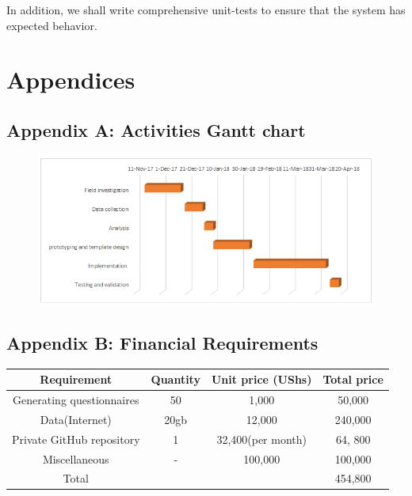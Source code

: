 \documentclass[12pt]{article}
\begin{document}
	In addition, we shall write comprehensive unit-tests to ensure that the system has expected behavior.

\newpage


\newpage
\section{Appendices}
\subsection{Appendix A: Activities Gantt chart}
\begin{figure}[h]
	\begin{center} \includegraphics[width=1\linewidth]{gantt.png} \end{center}
\end{figure}
\subsection{Appendix B: Financial Requirements}
\begin{tabular} {|c|c|c|c|}
	\hline
	Requirement & Quantity & Unit price (UShs) & Total price \\ \hline
	Generating questionnaires & 50 &  1,000 & 50,000 \\ \hline
	Data(Internet) & 20gb &  12,000 & 240,000 \\ \hline
	Private GitHub repository & 1 &  32,400(per month) & 64, 800\\ \hline
	Miscellaneous & -  & 100,000 & 100,000\\ \hline
	Total &  &  & 454,800\\ \hline
\end{tabular}
\end{document}
